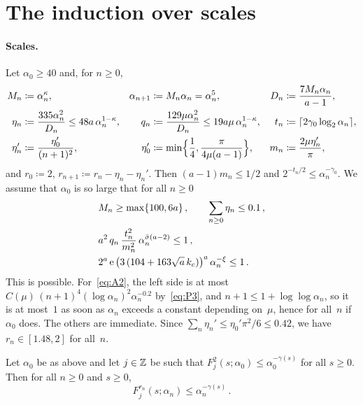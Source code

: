 \documentclass[11pt,letterpaper]{article}
\begin{document}
\section{The induction over scales}
\label{sec:induction}

\paragraph{Scales.} Let $\alpha_0\ge40$ and, for $n\ge0$,
\begin{align*}
  M_n&\coloneqq\alpha_n^{\kappa},&\alpha_{n+1}&\coloneqq M_n\alpha_n=\alpha_n^{5},&D_n&\coloneqq\frac{7M_n\alpha_n}{a-1},\\
  \eta_n&\coloneqq\frac{335\alpha_n^2}{D_n}\le48a\,\alpha_n^{1-\kappa},&q_n&\coloneqq\frac{129\mu\alpha_n^2}{D_n}\le19a\mu\,\alpha_n^{1-\kappa},&t_n&\coloneqq\lceil2\gamma_0\log_2\alpha_n\rceil,\\
  \eta_n'&\coloneqq\frac{\eta_0'}{(n+1)^2},&\eta_0'&\coloneqq\min\Bigl\{\frac14,\frac{\pi}{4\mu(a-1)}\Bigr\},&m_n&\coloneqq\frac{2\mu\eta_n'}{\pi},
\end{align*}
and $r_0\coloneqq2$, $r_{n+1}\coloneqq r_n-\eta_n-\eta_n'$. Then $(a-1)m_n\le1/2$ and $2^{-t_n/2}\le\alpha_n^{-\gamma_0}$. We assume that $\alpha_0$ is so large that for all $n\ge0$
\begin{align}
\label{eq:A1}
  &M_n\ge\max\{100,6a\}\,,\qquad\sum_{n\ge0}\eta_n\le0.1\,,\\
\label{eq:A2}
  &a^2\,q_n\,\frac{t_n^2}{m_n^2}\,\alpha_n^{\bar\sigma(a-2)}\le1\,,\\
\label{eq:A3}
  &2^a\,\mathrm{e}\,\bigl(3\,(104+163\sqrt a\,k_c)\bigr)^a\,\alpha_n^{-\xi}\le1\,.
\end{align}
This is possible. For~\eqref{eq:A2}, the left side is at most $C(\mu)\,(n+1)^4(\log\alpha_n)^2\alpha_n^{-0.2}$ by~\eqref{eq:P3}, and $n+1\le1+\log\log\alpha_n$, so it is at most~$1$ as soon as $\alpha_n$ exceeds a constant depending on~$\mu$, hence for all~$n$ if $\alpha_0$ does. The others are immediate. Since $\sum_n\eta_n'\le\eta_0'\pi^2/6\le0.42$, we have $r_n\in[1.48,2]$ for all~$n$.

\begin{theorem}[Induction]
\label{thm:induction}
Let $\alpha_0$ be as above and let $j\in\mathbb Z$ be such that $F_j^{2}(s;\alpha_0)\le\alpha_0^{-\gamma(s)}$ for all $s\ge0$. Then for all $n\ge0$ and $s\ge0$,
\begin{equation}
\label{eq:hyp}
  F_j^{r_n}(s;\alpha_n)\le\alpha_n^{-\gamma(s)}\,.
\end{equation}
\end{theorem}
\end{document}
